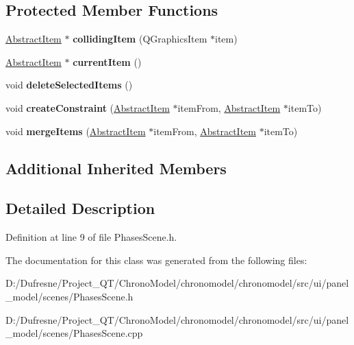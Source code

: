 \subsection*{Protected Member Functions}
\begin{DoxyCompactItemize}
\item 
\hypertarget{class_phases_scene_a215eb28aca7023c1bc122b72e227d558}{\hyperlink{class_abstract_item}{Abstract\-Item} $\ast$ {\bfseries colliding\-Item} (Q\-Graphics\-Item $\ast$item)}\label{class_phases_scene_a215eb28aca7023c1bc122b72e227d558}

\item 
\hypertarget{class_phases_scene_ae96e4e34ab78782ae2126ba6aae5f243}{\hyperlink{class_abstract_item}{Abstract\-Item} $\ast$ {\bfseries current\-Item} ()}\label{class_phases_scene_ae96e4e34ab78782ae2126ba6aae5f243}

\item 
\hypertarget{class_phases_scene_aee11014f163f00ae41763000c4949d85}{void {\bfseries delete\-Selected\-Items} ()}\label{class_phases_scene_aee11014f163f00ae41763000c4949d85}

\item 
\hypertarget{class_phases_scene_a58abcd885f8606d955615d8344a9cb3c}{void {\bfseries create\-Constraint} (\hyperlink{class_abstract_item}{Abstract\-Item} $\ast$item\-From, \hyperlink{class_abstract_item}{Abstract\-Item} $\ast$item\-To)}\label{class_phases_scene_a58abcd885f8606d955615d8344a9cb3c}

\item 
\hypertarget{class_phases_scene_a7ea9ddec2371ee379dd1d98dee0d269e}{void {\bfseries merge\-Items} (\hyperlink{class_abstract_item}{Abstract\-Item} $\ast$item\-From, \hyperlink{class_abstract_item}{Abstract\-Item} $\ast$item\-To)}\label{class_phases_scene_a7ea9ddec2371ee379dd1d98dee0d269e}

\end{DoxyCompactItemize}
\subsection*{Additional Inherited Members}


\subsection{Detailed Description}


Definition at line 9 of file Phases\-Scene.\-h.



The documentation for this class was generated from the following files\-:\begin{DoxyCompactItemize}
\item 
D\-:/\-Dufresne/\-Project\-\_\-\-Q\-T/\-Chrono\-Model/chronomodel/chronomodel/src/ui/panel\-\_\-model/scenes/Phases\-Scene.\-h\item 
D\-:/\-Dufresne/\-Project\-\_\-\-Q\-T/\-Chrono\-Model/chronomodel/chronomodel/src/ui/panel\-\_\-model/scenes/Phases\-Scene.\-cpp\end{DoxyCompactItemize}
